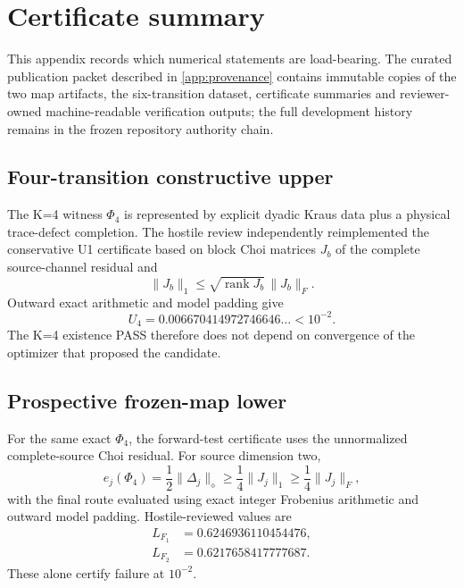 \section{Certificate summary}
\label{app:certificates}

This appendix records which numerical statements are load-bearing.  The curated publication packet described in \cref{app:provenance} contains immutable copies of the two map artifacts, the six-transition dataset, certificate summaries and reviewer-owned machine-readable verification outputs; the full development history remains in the frozen repository authority chain.

\subsection{Four-transition constructive upper}

The K=4 witness $\Phi_4$ is represented by explicit dyadic Kraus data plus a physical trace-defect completion.  The hostile review independently reimplemented the conservative U1 certificate based on block Choi matrices $J_b$ of the complete source-channel residual and
\begin{equation}
\|J_b\|_1\le \sqrt{\operatorname{rank}J_b}\,\|J_b\|_F.
\end{equation}
Outward exact arithmetic and model padding give
\begin{equation}
U_4=0.006670414972746646\ldots<10^{-2}.
\end{equation}
The K=4 existence PASS therefore does not depend on convergence of the optimizer that proposed the candidate.

\subsection{Prospective frozen-map lower}

For the same exact $\Phi_4$, the forward-test certificate uses the unnormalized complete-source Choi residual.  For source dimension two,
\begin{equation}
e_j(\Phi_4)=\frac12\|\Delta_j\|_\diamond
\ge\frac14\|J_j\|_1
\ge\frac14\|J_j\|_F,
\end{equation}
with the final route evaluated using exact integer Frobenius arithmetic and outward model padding.  Hostile-reviewed values are
\begin{align}
L_{F_1}&=0.6246936110454476,\\
L_{F_2}&=0.6217658417777687.
\end{align}
These alone certify failure at $10^{-2}$.

